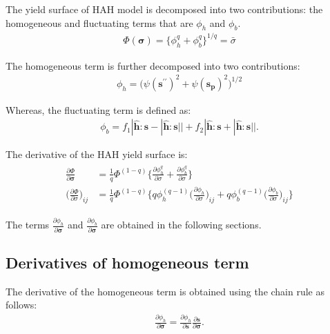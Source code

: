 \documentclass[12pt]{amsart}
\begin{document}
The yield surface of HAH model is decomposed into two contributions: the homogeneous and fluctuating terms that are $\phi_h$ and $\phi_b$.
\begin{eqnarray}
  \label{eq:hah_def}
  \Phi(\mathbf{\sigma})=\{\phi_h^q + \phi_b^q \}^{1/q}=\bar{\sigma}
\end{eqnarray}

The homogeneous term is further decomposed into two contributions:
\begin{eqnarray}
  \label{eq:hah_homo}
  \phi_h = \big(\psi(\mathbf{s}^{\prime\prime})^2+\psi(\mathbf{s_p})^2\big)^{1/2}
\end{eqnarray}

Whereas, the fluctuating term is defined as:
\begin{eqnarray}
    \label{eq:fluc}
\phi_b  = f_1|\hat{\mathbf{h}}:\mathbf{s} - |\hat{\mathbf{h}}:\mathbf{s}||    + f_2|\hat{\mathbf{h}}:\mathbf{s} + |\hat{\mathbf{h}}:\mathbf{s}||.
\end{eqnarray}

The derivative of the HAH yield surface is:
\begin{eqnarray}
  \begin{split}
  \label{eq:hah_deriv}
  \frac{\partial\Phi}{\partial\mathbf{\sigma}} &=\frac{1}{q}\Phi^{(1-q)} \bigg\{                  \frac{\partial{\phi_h^q}}{\partial{\sigma}}  +                 \frac{\partial{\phi_b^q}}{\partial{\sigma}}         \bigg\}\\
  \bigg(\frac{\partial\Phi}{\partial\sigma}\bigg)_{ij}&=\frac{1}{q}\Phi^{(1-q)} \bigg\{  q \phi_h^{(q-1)}\Big(\frac{\partial{\phi_h}  }{\partial{\sigma}}\Big)_{ij}  + q \phi_b^{(q-1)} \Big(\frac{\partial{\phi_b}  }{ \partial\sigma}\Big)_{ij}         \bigg\}
  \end{split}
\end{eqnarray}

The terms $\frac{\partial{\phi_h}  }{\partial{\mathbf{\sigma}}}$ and $\frac{\partial{\phi_b}  }{\partial{\mathbf{\sigma}}}$ are obtained in the following sections.


\subsection{Derivatives of homogeneous term}
\label{sec:2.1}


The derivative of the homogeneous term is obtained using the chain rule as follows:
\begin{eqnarray}
  \label{eq:derv1}
  \frac{\partial{\phi_h}  }{\partial{\mathbf{\sigma}}}  =   \frac{\partial{\phi_h}}{\partial{\mathbf{s}}} \frac{\partial{\mathbf{s}}}{\partial{\mathbf{\sigma}}}.
\end{eqnarray}
\end{document}
